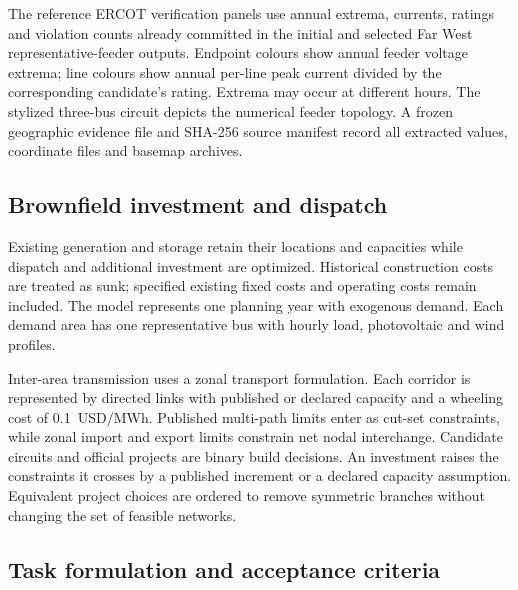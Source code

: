\documentclass[pdflatex,sn-nature]{sn-jnl}
\begin{document}
The reference ERCOT verification panels use annual extrema, currents, ratings and violation counts already committed in the initial and selected Far West representative-feeder outputs. Endpoint colours show annual feeder voltage extrema; line colours show annual per-line peak current divided by the corresponding candidate's rating. Extrema may occur at different hours. The stylized three-bus circuit depicts the numerical feeder topology. A frozen geographic evidence file and SHA-256 source manifest record all extracted values, coordinate files and basemap archives.

\subsection{Brownfield investment and dispatch}

Existing generation and storage retain their locations and capacities while dispatch and additional investment are optimized. Historical construction costs are treated as sunk; specified existing fixed costs and operating costs remain included. The model represents one planning year with exogenous demand. Each demand area has one representative bus with hourly load, photovoltaic and wind profiles.

Inter-area transmission uses a zonal transport formulation. Each corridor is represented by directed links with published or declared capacity and a wheeling cost of 0.1~USD/MWh. Published multi-path limits enter as cut-set constraints, while zonal import and export limits constrain net nodal interchange. Candidate circuits and official projects are binary build decisions. An investment raises the constraints it crosses by a published increment or a declared capacity assumption. Equivalent project choices are ordered to remove symmetric branches without changing the set of feasible networks.



\subsection{Task formulation and acceptance criteria}
\end{document}
